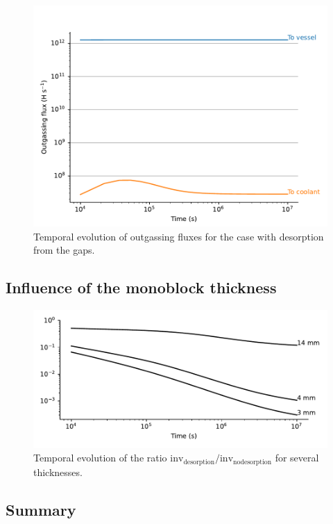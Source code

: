 \begin{figure} [h]
    \centering
    \includegraphics[width=\linewidth]{Figures/Chapter3/monoblocks/3D_monoblocks/fluxes.pdf}
    \caption{Temporal evolution of outgassing fluxes for the case with desorption from the gaps.}
    \label{fig: fluxes DEMO monoblock}
\end{figure}

\subsection{Influence of the monoblock thickness}

\begin{figure} [h]
    \centering
    \includegraphics[width=\linewidth]{Figures/Chapter3/monoblocks/3D_monoblocks/influence_of_thickness.pdf}
    \caption{Temporal evolution of the ratio $\mathrm{inv}_\mathrm{desorption} / \mathrm{inv}_\mathrm{no desorption}$ for several thicknesses.}
\end{figure}

\subsection{Summary}